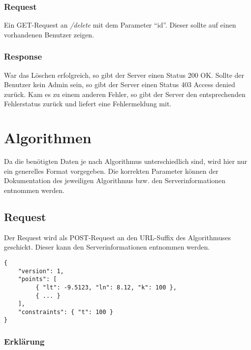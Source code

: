 \documentclass[ngerman]{scrartcl}
\begin{document}
		\subsubsection*{Request}
		
		Ein GET-Request an \textit{/delete} mit dem Parameter 		"`id"'.
		Dieser sollte auf einen vorhandenen Benutzer zeigen.
		
		\subsubsection*{Response}
		
		War das Löschen erfolgreich, so gibt der Server einen Status 200 OK.
		Sollte der Benutzer kein Admin sein, so gibt der Server einen Status 403 Access denied zurück.
		Kam es zu einem anderen Fehler, so gibt der Server den entsprechenden Fehlerstatus zurück und liefert eine Fehlermeldung mit.
		
   	
\section{Algorithmen}

Da die benötigten Daten je nach Algorithmus unterschiedlich sind, wird hier nur ein generelles Format vorgegeben. Die korrekten Parameter können der Dokumentation des jeweiligen Algorithmus bzw. den Serverinformationen entnommen werden.

	\subsection*{Request}
	
	Der Request wird als POST-Request an den URL-Suffix des Algorithmuses geschickt. Dieser kann den Serverinformationen entnommen werden.
	
	\begin{lstlisting}
{
    "version": 1,
    "points": [
         { "lt": -9.5123, "ln": 8.12, "k": 100 },
         { ... }
    ],
    "constraints": { "t": 100 }
}    	
	\end{lstlisting}
	
		\subsubsection*{Erklärung}
	
\end{document}
